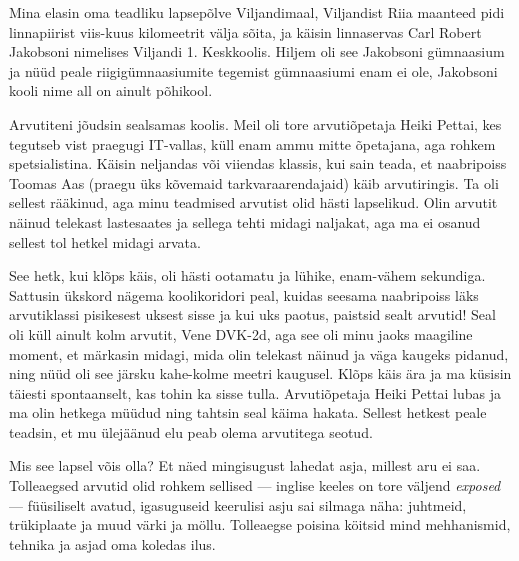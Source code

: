 \label{sisu:asko}


Mina elasin oma teadliku lapsepõlve 
Viljandimaal, Viljandist Riia maanteed pidi linnapiirist viis-kuus kilomeetrit välja sõita, ja käisin linnaservas Carl 
Robert Jakobsoni nimelises Viljandi 1. Keskkoolis. Hiljem oli see Jakobsoni 
gümnaasium ja nüüd peale riigigümnaasiumite tegemist gümnaasiumi enam ei ole, 
Jakobsoni kooli nime all on ainult põhikool. 

Arvutiteni jõudsin sealsamas koolis. Meil oli tore arvutiõpetaja 
Heiki Pettai, kes tegutseb vist praegugi 
IT-vallas, küll enam ammu mitte õpetajana, aga rohkem 
spetsialistina. Käisin neljandas või viiendas 
klassis, kui sain teada, et naabripoiss Toomas Aas (praegu üks kõvemaid tarkvaraarendajaid) käib arvutiringis. Ta oli sellest 
rääkinud, aga minu teadmised arvutist olid hästi lapselikud. Olin arvutit näinud telekast lastesaates ja sellega
tehti midagi naljakat, aga ma ei osanud sellest tol hetkel 
midagi arvata. 

See hetk, kui klõps käis, oli hästi ootamatu ja 
lühike, enam-vähem sekundiga. Sattusin ükskord nägema koolikoridori 
peal, kuidas seesama naabripoiss läks arvutiklassi pisikesest uksest sisse ja kui uks paotus, paistsid sealt arvutid!
Seal oli küll ainult kolm arvutit, Vene DVK-2d, aga see oli minu jaoks
maagiline moment, et märkasin midagi, mida olin telekast näinud ja
väga kaugeks pidanud, ning nüüd oli see järsku kahe-kolme meetri 
kaugusel. Klõps käis ära ja ma küsisin täiesti spontaanselt, kas 
tohin ka sisse tulla. Arvutiõpetaja Heiki Pettai 
lubas ja ma olin hetkega müüdud ning tahtsin seal käima 
hakata. Sellest hetkest peale teadsin, et mu ülejäänud elu peab olema 
arvutitega seotud. 


Mis see lapsel võis olla? Et näed mingisugust lahedat asja, millest aru 
ei saa. Tolleaegsed arvutid olid rohkem sellised --- inglise keeles 
on tore väljend \emph{exposed} --- füüsiliselt avatud, 
igasuguseid keerulisi asju sai silmaga näha: juhtmeid, trükiplaate ja muud värki ja möllu. Tolleaegse 
poisina köitsid mind mehhanismid, tehnika ja asjad oma 
koledas ilus. 


